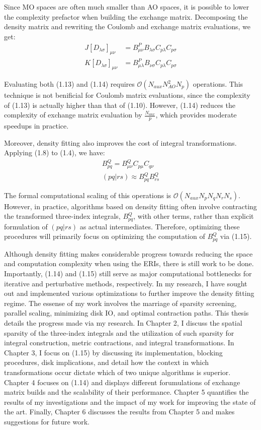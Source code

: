 \noindent Since MO spaces are often much smaller than AO spaces, it is possible to lower the complexity prefactor when 
building the exchange matrix.  
Decomposing the density matrix and rewriting the Coulomb and exchange matrix evaluations, we get:
\begin{align}
J[D_{\lambda \sigma}]_{\mu \nu} &= B_{\mu \nu}^P B_{\lambda \sigma}C_{p\lambda}C_{p\sigma} \\
K[D_{\lambda \sigma}]_{\mu \nu} &= B_{\mu \lambda}^P B_{\nu \sigma}C_{p\lambda}C_{p\sigma}
\end{align}

\noindent Evaluating both (1.13) and (1.14) requires $\mathcal{O}(N_{aux}N_{AO}^2N_p)$ operations.
This technique is not benificial for Coulomb matrix evaluations, since the complexity of (1.13) is actually
higher than that of (1.10). However, (1.14) reduces the complexity of exchange matrix evaluation by  
$\frac{N_{aux}}{p}$, which provides moderate speedups in practice.

Moreover, density fitting also improves the cost of integral transformations. Applying (1.8) to (1.4), we have:
\begin{align}
B^Q_{pq} = B^Q_{\mu \nu}C_{p \mu}C_{q \nu} \\
(pq | rs) \approx B^Q_{pq}B^Q_{rs}
\end{align}

\noindent The formal computational scaling of this operations is $\mathcal{O}(N_{aux}N_pN_qN_rN_s)$.  However, in practice,
algorithms based on density fitting often involve contracting the transformed three-index integrals, $B^Q_{pq}$, with other terms, 
rather than explicit formulation of $(pq|rs)$ as actual intermediates. Therefore, optimizing these procedures will primarily
focus on optimizing the computation of $B^Q_{pq}$ via (1.15). 

Although density fitting makes considerable progress towards reducing the space and computation complexity when
using the ERIs, there is still work to be done. Importantly, (1.14) and (1.15) still serve as major computational
bottlenecks for iterative and perturbative methods, respectively. In my research, I have sought out and implemented various 
optimizations to further improve the density fitting regime. The essense of my work involves the marriage of sparsity screening,
parallel scaling, minimizing disk IO, and optimal contraction paths. This thesis details the progress made via my research.
In Chapter 2, I discuss the spatial sparsity of the three-index integrals and the utilization of such sparsity for integral 
construction, metric contractions, and integral transformations.
In Chapter 3, I focus on (1.15) by discussing its implementation, blocking procedures, disk implications,
and detail how the context in which transformations occur dictate which of two unique algorithms is superior.
Chapter 4 focuses on (1.14) and displays different forumulations of exchange matrix builds and the scalability of their performance.
Chapter 5 quantifies the results of my investigations and the impact of my work for improving the state of the art. 
Finally, Chapter 6 discusses the results from Chapter 5 and makes suggestions for future work.



